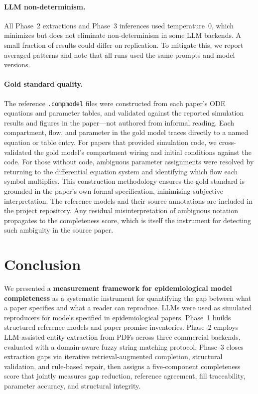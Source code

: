 \paragraph{LLM non-determinism.}
All Phase~2 extractions and Phase~3 inferences used temperature~0, which minimizes but
does not eliminate non-determinism in some LLM backends. A small fraction of results could
differ on replication. To mitigate this, we report averaged patterns and note that all runs
used the same prompts and model versions.

\paragraph{Gold standard quality.}
The reference \texttt{.compmodel} files were constructed from each paper's ODE equations
and parameter tables, and validated against the reported simulation results and figures
in the paper---not authored from informal reading.
Each compartment, flow, and parameter in the gold model traces directly to a named
equation or table entry. For papers that provided simulation code, we cross-validated
the gold model's compartment wiring and initial conditions against the code. For those
without code, ambiguous parameter assignments were resolved by returning to the
differential equation system and identifying which flow each symbol multiplies.
This construction methodology ensures the gold standard is grounded in the paper's own
formal specification, minimising subjective interpretation. The reference models and
their source annotations are included in the project repository.
Any residual misinterpretation of ambiguous notation propagates to the completeness score,
which is itself the instrument for detecting such ambiguity in the source paper.

\section{Conclusion}
\label{sec:conclusion}

We presented a \textbf{measurement framework for epidemiological model completeness} as a
systematic instrument for quantifying the gap between what a paper specifies and what a
reader can reproduce. LLMs were used as simulated reproducers for models specified in epidemiological papers. Phase~1 builds structured reference models
and paper promise inventories. Phase~2 employs LLM-assisted entity extraction from PDFs
across three commercial backends, evaluated with a domain-aware fuzzy string matching
protocol. Phase~3 closes extraction gaps via iterative retrieval-augmented completion,
structural validation, and rule-based repair, then assigns a five-component completeness
score that jointly measures gap reduction, reference agreement, fill traceability,
parameter accuracy, and structural integrity.

